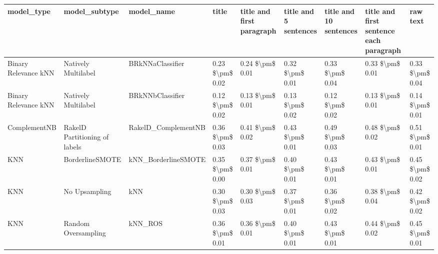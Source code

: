 \begin{tabular}{lllllllll}
\toprule
                     model\_type &                 model\_subtype &                                   model\_name &           title & title and first paragraph & title and 5 sentences & title and 10 sentences & title and first sentence each paragraph &            raw text \\
\midrule
           Binary Relevance kNN &           Natively Multilabel &                             BRkNNaClassifier & 0.23 \$\textbackslash pm\$ 0.02 &           0.24 \$\textbackslash pm\$ 0.01 &       0.32 \$\textbackslash pm\$ 0.01 &        0.33 \$\textbackslash pm\$ 0.04 &                         0.33 \$\textbackslash pm\$ 0.01 &     0.33 \$\textbackslash pm\$ 0.04 \\
           Binary Relevance kNN &           Natively Multilabel &                             BRkNNbClassifier & 0.12 \$\textbackslash pm\$ 0.02 &           0.13 \$\textbackslash pm\$ 0.01 &       0.13 \$\textbackslash pm\$ 0.02 &        0.12 \$\textbackslash pm\$ 0.02 &                         0.13 \$\textbackslash pm\$ 0.01 &     0.14 \$\textbackslash pm\$ 0.01 \\
                   ComplementNB & RakelD Partitioning of labels &                          RakelD\_ComplementNB & 0.36 \$\textbackslash pm\$ 0.03 &           0.41 \$\textbackslash pm\$ 0.02 &       0.43 \$\textbackslash pm\$ 0.01 &        0.49 \$\textbackslash pm\$ 0.03 &                         0.48 \$\textbackslash pm\$ 0.02 &     0.51 \$\textbackslash pm\$ 0.01 \\
                            KNN &               BorderlineSMOTE &                          kNN\_BorderlineSMOTE & 0.35 \$\textbackslash pm\$ 0.00 &           0.37 \$\textbackslash pm\$ 0.01 &       0.40 \$\textbackslash pm\$ 0.01 &        0.43 \$\textbackslash pm\$ 0.01 &                         0.43 \$\textbackslash pm\$ 0.01 &     0.45 \$\textbackslash pm\$ 0.02 \\
                            KNN &                 No Upsampling &                                          kNN & 0.30 \$\textbackslash pm\$ 0.03 &           0.30 \$\textbackslash pm\$ 0.03 &       0.37 \$\textbackslash pm\$ 0.01 &        0.36 \$\textbackslash pm\$ 0.02 &                         0.38 \$\textbackslash pm\$ 0.04 &     0.42 \$\textbackslash pm\$ 0.02 \\
                            KNN &           Random Oversampling &                                      kNN\_ROS & 0.36 \$\textbackslash pm\$ 0.01 &           0.36 \$\textbackslash pm\$ 0.01 &       0.40 \$\textbackslash pm\$ 0.01 &        0.43 \$\textbackslash pm\$ 0.01 &                         0.44 \$\textbackslash pm\$ 0.02 &     0.45 \$\textbackslash pm\$ 0.01 \\

\end{tabular}
